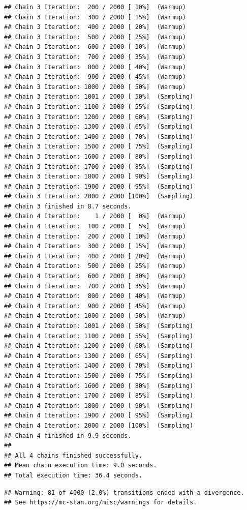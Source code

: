\documentclass[
]{article}
\begin{document}
\begin{verbatim}
## Chain 3 Iteration:  200 / 2000 [ 10%]  (Warmup) 
## Chain 3 Iteration:  300 / 2000 [ 15%]  (Warmup) 
## Chain 3 Iteration:  400 / 2000 [ 20%]  (Warmup) 
## Chain 3 Iteration:  500 / 2000 [ 25%]  (Warmup) 
## Chain 3 Iteration:  600 / 2000 [ 30%]  (Warmup) 
## Chain 3 Iteration:  700 / 2000 [ 35%]  (Warmup) 
## Chain 3 Iteration:  800 / 2000 [ 40%]  (Warmup) 
## Chain 3 Iteration:  900 / 2000 [ 45%]  (Warmup) 
## Chain 3 Iteration: 1000 / 2000 [ 50%]  (Warmup) 
## Chain 3 Iteration: 1001 / 2000 [ 50%]  (Sampling) 
## Chain 3 Iteration: 1100 / 2000 [ 55%]  (Sampling) 
## Chain 3 Iteration: 1200 / 2000 [ 60%]  (Sampling) 
## Chain 3 Iteration: 1300 / 2000 [ 65%]  (Sampling) 
## Chain 3 Iteration: 1400 / 2000 [ 70%]  (Sampling) 
## Chain 3 Iteration: 1500 / 2000 [ 75%]  (Sampling) 
## Chain 3 Iteration: 1600 / 2000 [ 80%]  (Sampling) 
## Chain 3 Iteration: 1700 / 2000 [ 85%]  (Sampling) 
## Chain 3 Iteration: 1800 / 2000 [ 90%]  (Sampling) 
## Chain 3 Iteration: 1900 / 2000 [ 95%]  (Sampling) 
## Chain 3 Iteration: 2000 / 2000 [100%]  (Sampling) 
## Chain 3 finished in 8.7 seconds.
## Chain 4 Iteration:    1 / 2000 [  0%]  (Warmup) 
## Chain 4 Iteration:  100 / 2000 [  5%]  (Warmup) 
## Chain 4 Iteration:  200 / 2000 [ 10%]  (Warmup) 
## Chain 4 Iteration:  300 / 2000 [ 15%]  (Warmup) 
## Chain 4 Iteration:  400 / 2000 [ 20%]  (Warmup) 
## Chain 4 Iteration:  500 / 2000 [ 25%]  (Warmup) 
## Chain 4 Iteration:  600 / 2000 [ 30%]  (Warmup) 
## Chain 4 Iteration:  700 / 2000 [ 35%]  (Warmup) 
## Chain 4 Iteration:  800 / 2000 [ 40%]  (Warmup) 
## Chain 4 Iteration:  900 / 2000 [ 45%]  (Warmup) 
## Chain 4 Iteration: 1000 / 2000 [ 50%]  (Warmup) 
## Chain 4 Iteration: 1001 / 2000 [ 50%]  (Sampling) 
## Chain 4 Iteration: 1100 / 2000 [ 55%]  (Sampling) 
## Chain 4 Iteration: 1200 / 2000 [ 60%]  (Sampling) 
## Chain 4 Iteration: 1300 / 2000 [ 65%]  (Sampling) 
## Chain 4 Iteration: 1400 / 2000 [ 70%]  (Sampling) 
## Chain 4 Iteration: 1500 / 2000 [ 75%]  (Sampling) 
## Chain 4 Iteration: 1600 / 2000 [ 80%]  (Sampling) 
## Chain 4 Iteration: 1700 / 2000 [ 85%]  (Sampling) 
## Chain 4 Iteration: 1800 / 2000 [ 90%]  (Sampling) 
## Chain 4 Iteration: 1900 / 2000 [ 95%]  (Sampling) 
## Chain 4 Iteration: 2000 / 2000 [100%]  (Sampling) 
## Chain 4 finished in 9.9 seconds.
## 
## All 4 chains finished successfully.
## Mean chain execution time: 9.0 seconds.
## Total execution time: 36.4 seconds.
\end{verbatim}

\begin{verbatim}
## Warning: 81 of 4000 (2.0%) transitions ended with a divergence.
## See https://mc-stan.org/misc/warnings for details.
\end{verbatim}
\end{document}
